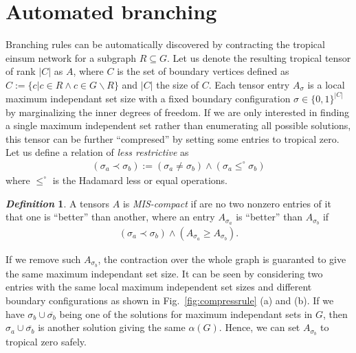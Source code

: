 \documentclass{article}
\newcommand{\<}{\langle}
\renewcommand{\>}{\rangle}
\newcommand{\Fig}[1]{Fig.~\ref{#1}}
\theoremstyle{definition}\newtheorem{definition}{\textit{Definition}}
\begin{document}
\section{Automated branching}
Branching rules can be automatically discovered by contracting the tropical einsum network for a subgraph $R \subseteq G$.
Let us denote the resulting tropical tensor of rank $|C|$ as $A$, where $C$ is the set of boundary vertices defined as $C := \{c | c\in R \land c \in G\backslash R\}$ and $|C|$ the size of $C$.
Each tensor entry $A_{\sigma}$ is a local maximum independant set size with a fixed boundary configuration $\sigma \in \{0,1\}^{|C|}$ by marginalizing the inner degrees of freedom.
If we are only interested in finding a single maximum independent set rather than enumerating all possible solutions,
this tensor can be further ``compresed'' by setting some entries to tropical zero.
Let us define a relation of \textit{less restrictive} as
\begin{align}
(\sigma_a \prec \sigma_b) := (\sigma_a \neq \sigma_b) \land (\sigma_a \leq^\circ \sigma_b)
\end{align}
where $\leq^\circ$ is the Hadamard less or equal operations.

\begin{definition}
A tensors $A$ is \textit{MIS-compact} if are no two nonzero entries of it that one is ``better'' than another,
where an entry $A_{\sigma_a}$ is ``better'' than $A_{\sigma_b}$ if
\begin{align}
(\sigma_a \prec \sigma_b) \land (A_{\sigma_a} \geq A_{\sigma_b})\label{eq:compress}.
\end{align}
\end{definition}

If we remove such $A_{\sigma_b}$, the contraction over the whole graph is guaranted to give the same maximum independant set size.
It can be seen by considering two entries with the same local maximum independent set sizes and different boundary configurations as shown in \Fig{fig:compressrule} (a) and (b).
If we have $\sigma_b \cup \overline{\sigma_b}$ being one of the solutions for maximum independant sets in $G$, then $\sigma_a \cup \overline{\sigma_b}$ is another solution giving the same $\alpha(G)$.
Hence, we can set $A_{\sigma_b}$ to tropical zero safely.
\end{document}
